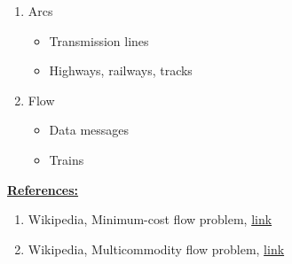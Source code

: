 \documentclass[12pt]{article}
\begin{document}
\begin{enumerate}[1.]
\begin{itemize}
\begin{itemize}
\begin{enumerate}[1)]
                \item Arcs
                \begin{itemize}
                    \item Transmission lines
                    \item Highways, railways, tracks
                \end{itemize}

                \item Flow

                \begin{itemize}
                    \item Data messages
                    \item Trains
                \end{itemize}
            \end{enumerate}
        \end{itemize}
    \end{itemize}

    \bigskip

    \underline{\textbf{References:}}

    \begin{enumerate}[1)]
        \item Wikipedia, Minimum-cost flow problem, \href{https://en.wikipedia.org/wiki/Minimum-cost_flow_problem}{link}
        \item Wikipedia, Multicommodity flow problem, \href{https://en.wikipedia.org/wiki/Multi-commodity_flow_problem}{link}
    \end{enumerate}

\end{enumerate}
\end{document}
